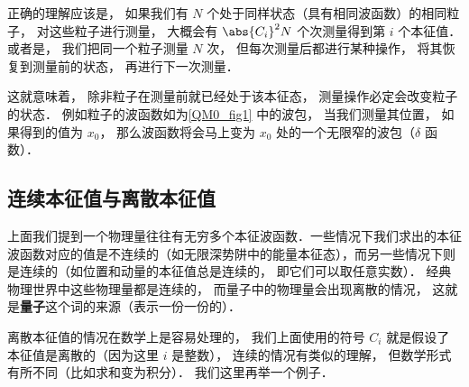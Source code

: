 正确的理解应该是， 如果我们有 $N$ 个处于同样状态（具有相同波函数）的相同粒子， 对这些粒子进行测量， 大概会有 $\abs{C_i}^2 N$ 个次测量得到第 $i$ 个本征值． 或者是， 我们把同一个粒子测量 $N$ 次， 但每次测量后都进行某种操作， 将其恢复到测量前的状态， 再进行下一次测量．

这就意味着， 除非粒子在测量前就已经处于该本征态， 测量操作必定会改变粒子的状态． 例如粒子的波函数如为\autoref{QM0_fig1} 中的波包， 当我们测量其位置， 如果得到的值为 $x_0$， 那么波函数将会马上变为 $x_0$ 处的一个无限窄的波包（$\delta$ 函数）．

\subsection{连续本征值与离散本征值}
上面我们提到一个物理量往往有无穷多个本征波函数．一些情况下我们求出的本征波函数对应的值是不连续的（如无限深势阱中的能量本征态），而另一些情况下则是连续的（如位置和动量的本征值总是连续的， 即它们可以取任意实数）． 经典物理世界中这些物理量都是连续的， 而量子中的物理量会出现离散的情况， 这就是\textbf{量子}这个词的来源（表示一份一份的）．

离散本征值的情况在数学上是容易处理的， 我们上面使用的符号 $C_i$ 就是假设了本征值是离散的（因为这里 $i$ 是整数）， 连续的情况有类似的理解， 但数学形式有所不同（比如求和变为积分）． 我们这里再举一个例子．

